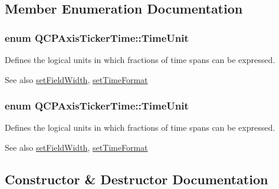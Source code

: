 \subsection{Member Enumeration Documentation}
\subsubsection[{\texorpdfstring{Time\+Unit}{TimeUnit}}]{\setlength{\rightskip}{0pt plus 5cm}enum {\bf Q\+C\+P\+Axis\+Ticker\+Time\+::\+Time\+Unit}}\hypertarget{class_q_c_p_axis_ticker_time_a5c48ded8c6d3a1aca9b68219469fea3e}{}\label{class_q_c_p_axis_ticker_time_a5c48ded8c6d3a1aca9b68219469fea3e}
Defines the logical units in which fractions of time spans can be expressed.

\begin{DoxySeeAlso}{See also}
\hyperlink{class_q_c_p_axis_ticker_time_adc13e54fc969be98a5c0e3fa0dbaa293}{set\+Field\+Width}, \hyperlink{class_q_c_p_axis_ticker_time_a2f30b6e5125bce4256be9ce3177088ea}{set\+Time\+Format} 
\end{DoxySeeAlso}
\subsubsection[{\texorpdfstring{Time\+Unit}{TimeUnit}}]{\setlength{\rightskip}{0pt plus 5cm}enum {\bf Q\+C\+P\+Axis\+Ticker\+Time\+::\+Time\+Unit}}\hypertarget{class_q_c_p_axis_ticker_time_a5c48ded8c6d3a1aca9b68219469fea3e}{}\label{class_q_c_p_axis_ticker_time_a5c48ded8c6d3a1aca9b68219469fea3e}
Defines the logical units in which fractions of time spans can be expressed.

\begin{DoxySeeAlso}{See also}
\hyperlink{class_q_c_p_axis_ticker_time_adc13e54fc969be98a5c0e3fa0dbaa293}{set\+Field\+Width}, \hyperlink{class_q_c_p_axis_ticker_time_a2f30b6e5125bce4256be9ce3177088ea}{set\+Time\+Format} 
\end{DoxySeeAlso}


\subsection{Constructor \& Destructor Documentation}
